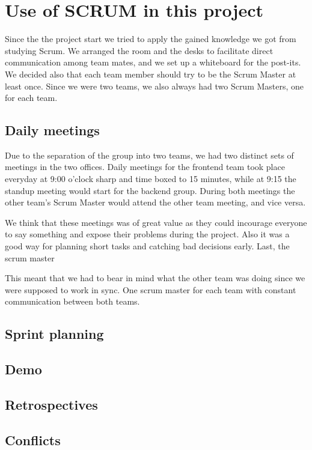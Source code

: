 \section{Use of SCRUM in this project}
Since the the project start we tried to apply the gained knowledge we got from studying Scrum.
We arranged the room and the desks to facilitate direct communication among team mates,
and we set up a whiteboard for the post-its. We decided also that each team member should try to
be the Scrum Master at least once. Since we were two teams, we also always had two Scrum Masters,
one for each team.

\subsection{Daily meetings}
Due to the separation of the group into two teams, we had two distinct sets of meetings in the two offices.
Daily meetings for the frontend team took place everyday at 9:00 o'clock sharp and time boxed to 15 minutes,
while at 9:15 the standup meeting would start for the backend group.
During both meetings the other team's Scrum Master would attend the other team meeting, and vice versa.


We think that these meetings was of great value as they could incourage everyone to say something and
expose their problems during the project. Also it was a good way for planning short tasks and catching bad decisions
early. Last, the scrum master 

This meant that we had to bear in mind what the other team was doing since we were supposed to work in sync.
One scrum master for each team with constant communication between both teams. 

\subsection{Sprint planning}

\subsection{Demo}

\subsection{Retrospectives}


\subsection{Conflicts}

